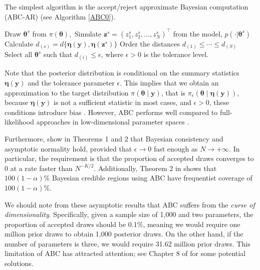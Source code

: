 The simplest algorithm is the accept/reject approximate Bayesian computation (ABC-AR) (see Algorithm \ref{ABC0}).

\begin{algorithm}
	\caption{Accept/reject ABC}\label{ABC0}
	\begin{algorithmic}[1]
		\State Draw ${\boldsymbol {\theta} }^{s}$ from $\pi({ \boldsymbol{\theta} }),$
		\State Simulate ${\boldsymbol z}^{s}=(z_{1}^{s},z_{2}^{s},...,z_{N}^{s})^{\top}$ from the model, $p(\cdot|{\boldsymbol{\theta} }^{s})$
		\State Calculate
		$d_{(s)}=d\{{\boldsymbol\eta }({\boldsymbol y}),{\boldsymbol \eta }({\boldsymbol z}^{s})\}$
		\EndFor
		\State Order the distances $d_{(1)}\leq\cdots\leq d_{(S)}$
		\State Select all $\boldsymbol{\theta}^s$ such that $d_{(i)}\leq \epsilon$, where $\epsilon>0$ is the tolerance level. 
	\end{algorithmic}
\end{algorithm}

Note that the posterior distribution is conditional on the summary statistics \( \boldsymbol{\eta}(\boldsymbol{y}) \) and the tolerance parameter \( \epsilon \). This implies that we obtain an approximation to the target distribution \( \pi(\boldsymbol{\theta} \mid \boldsymbol{y}) \), that is \( \pi_{\epsilon}(\boldsymbol{\theta} \mid \boldsymbol{\eta}(\boldsymbol{y})) \), because \( \boldsymbol{\eta}(\boldsymbol{y}) \) is not a sufficient statistic in most cases, and \( \epsilon > 0 \), these conditions introduce bias \cite{blum2010approximate}. However, ABC performs well compared to full-likelihood approaches in low-dimensional parameter spaces \cite{beaumont2002approximate}.

Furthermore, \cite{frazier2018asymptotic} show in Theorems 1 and 2 that Bayesian consistency and asymptotic normality hold, provided that \( \epsilon \to 0 \) fast enough as \( N \to +\infty \). In particular, the requirement is that the proportion of accepted draws converges to 0 at a rate faster than \( N^{-K / 2} \). Additionally, Theorem 2 in \cite{frazier2018asymptotic} shows that \( 100(1 -\alpha)\% \) Bayesian credible regions using ABC have frequentist coverage of \( 100(1 -\alpha)\% \). 

We should note from these asymptotic results that ABC suffers from the \textit{curse of dimensionality}. Specifically, given a sample size of 1,000 and two parameters, the proportion of accepted draws should be 0.1\%, meaning we would require one million prior draws to obtain 1,000 posterior draws. On the other hand, if the number of parameters is three, we would require 31.62 million prior draws. This limitation of ABC has attracted attention; see Chapter 8 of \cite{sisson2018handbook} for some potential solutions.

